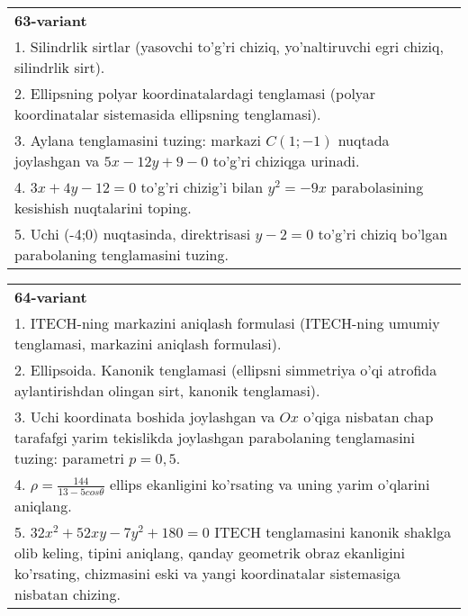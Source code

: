 \documentclass{article}
\begin{document}
\begin{tabular}{m{17cm}}
\textbf{63-variant}\\
1. Silindrlik sirtlar (yasovchi to'g'ri chiziq, yo'naltiruvchi egri chiziq, silindrlik sirt).\\

2. Ellipsning polyar koordinatalardagi tenglamasi (polyar koordinatalar sistemasida ellipsning tenglamasi).\\

3. Aylana tenglamasini tuzing: markazi $C(1;-1)$ nuqtada joylashgan va $5x-12y+9-0$ to'g'ri chiziqga urinadi.\\

4. $3x + 4y - 12 = 0$ to'g'ri chizig'i bilan $y^{2} = - 9x$ parabolasining kesishish nuqtalarini toping.  \\

5. Uchi (-4;0) nuqtasinda, direktrisasi $y - 2 = 0$ to'g'ri chiziq bo'lgan parabolaning tenglamasini tuzing.
\end{tabular}
\vspace{1cm}


\begin{tabular}{m{17cm}}
\textbf{64-variant}\\
1. ITECH-ning markazini aniqlash formulasi (ITECH-ning umumiy tenglamasi, markazini aniqlash formulasi).\\

2. Ellipsoida. Kanonik tenglamasi (ellipsni simmetriya o'qi atrofida aylantirishdan olingan sirt, kanonik tenglamasi).\\

3. Uchi koordinata boshida joylashgan va $Ox$ o'qiga nisbatan chap tarafafgi yarim tekislikda joylashgan parabolaning tenglamasini tuzing: parametri $p=0,5$.\\

4. $\rho = \frac{144}{13 - 5cos\theta}$ ellips ekanligini ko'rsating va uning yarim o'qlarini aniqlang.\\

5. $32x^{2} + 52xy - 7y^{2} + 180 = 0$ ITECH tenglamasini kanonik shaklga olib keling, tipini aniqlang, qanday geometrik obraz ekanligini ko'rsating, chizmasini eski va yangi koordinatalar sistemasiga nisbatan chizing.  
\end{tabular}
\vspace{1cm}
\end{document}
